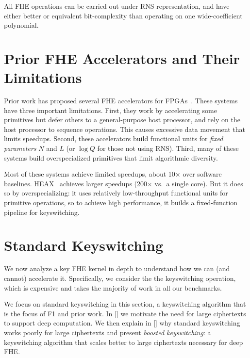All FHE operations can be carried out under RNS representation, and have either
better or equivalent bit-complexity than operating on one wide-coefficient
polynomial.

\section{Prior FHE Accelerators and Their Limitations}\label{sec:drawbacks}


Prior work has proposed several FHE accelerators for
FPGAs~\cite{cousins:hpec14:fpga-he,cousins:tetc17:fpga-he,doroz:tc15:accelerating-fhe,roy:hpca19:fpga-he,migliore:tecs17:he-karatsuba,riazi:asplos20:heax,turan:tc20:heaws,mert:tvlsi20:bfv-accel}.
These systems have three important limitations. First, they work by
accelerating some primitives but defer others to a general-purpose host
processor, and rely on the host processor to sequence operations. This causes
excessive data movement that limits speedups. Second, these accelerators build
functional units for \emph{fixed parameters} $N$ and $L$ (or $\log Q$ for those
not using RNS). Third, many of these systems build overspecialized primitives
that limit algorithmic diversity.

Most of these systems achieve limited speedups, about 10$\times$ over software
baselines. HEAX~\cite{riazi:asplos20:heax} achieves larger speedups
(200$\times$ vs.\ a single core). But it does so by overspecializing: it uses
relatively low-throughput functional units for primitive operations, so to
achieve high performance, it builds a fixed-function pipeline for keyswitching.

\section{Standard Keyswitching}
\label{sec:fhe_analysis}

We now analyze a key FHE kernel in depth to understand how we can (and cannot)
accelerate it. Specifically, we consider the the keyswitching
operation, which is expensive and takes the majority of work in all our
benchmarks.

We focus on standard keyswitching in this section, a keyswitching algorithm that is the
focus of F1 and prior work. In \autoref{} we motivate the need for large ciphertexts
to support deep computation. We then explain in \autoref{} why standard keyswitching works poorly
for large ciphertexts and present \emph{boosted keyswitching}: a keyswitching algorithm
that scales better to large ciphertexts necessary for deep FHE.


